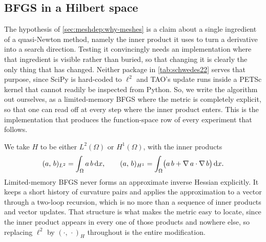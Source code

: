 \documentclass[a4paper,11pt]{article}
\newcommand{\Om}{\Omega}
\newcommand{\Lp}[1]{L^{2}(#1)}              %
\newcommand{\inner}[3]{(#1,\,#2)_{#3}}        %
\newcommand{\dx}{\,\mathrm{d}x}
\theoremstyle{spacedplain} \newtheorem{theorem}[counter]{Theorem} \newtheorem{lemma}[counter]{Lemma} \newtheorem{prop}[counter]{Proposition} \newtheorem{cor}[counter]{Corollary}
\theoremstyle{spaceddefinition} \newtheorem{defn}[counter]{Definition} \newtheorem{example}[counter]{Example} \newtheorem{remark}[counter]{Remark}
\begin{document}
\subsection{BFGS in a Hilbert space}
\label{sec:meshdep:hilbert-lbfgs}

The hypothesis of \cref{sec:meshdep:why-meshes} is a claim about a single ingredient of a quasi-Newton method, namely the inner product it uses to turn a derivative into a search direction. Testing it convincingly needs an implementation where that ingredient is visible rather than buried, so that changing it is clearly the only thing that has changed. Neither package in \cref{tab:schwedes22} serves that purpose, since SciPy is hard-coded to $\ell^{2}$ and TAO's update runs inside a PETSc kernel that cannot readily be inspected from Python. So, we write the algorithm out ourselves, as a limited-memory BFGS where the metric is completely explicit, so that one can read off at every step where the inner product enters. This is the implementation that produces the function-space row of every experiment that follows.

We take $H$ to be either $\Lp{\Om}$ or $H^{1}(\Om)$, with the inner products
\begin{equation}
  \inner{a}{b}{L^{2}} = \int_{\Om} a\, b \dx,
  \qquad
  \inner{a}{b}{H^{1}}
     = \int_{\Om} \bigl(a\, b + \grad a \cdot \grad b\bigr) \dx.
\end{equation}
Limited-memory BFGS never forms an approximate inverse Hessian explicitly. It keeps a short history of curvature pairs and applies the approximation to a vector through a two-loop recursion, which is no more than a sequence of inner products and vector updates. That structure is what makes the metric easy to locate, since the inner product appears in every one of those products and nowhere else, so replacing $\ell^{2}$ by $\inner{\cdot}{\cdot}{H}$ throughout is the entire modification.
\end{document}
